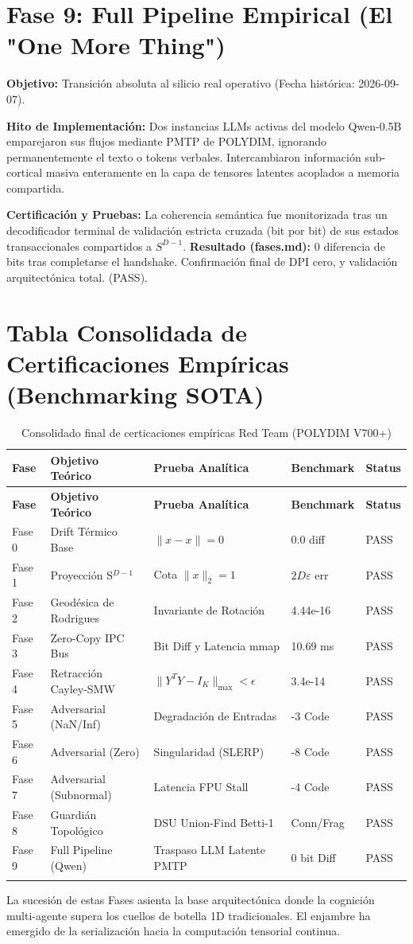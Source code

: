 \section{Fase 9: Full Pipeline Empirical (El "One More Thing")}

\textbf{Objetivo:} Transición absoluta al silicio real operativo (Fecha histórica: 2026-09-07).

\textbf{Hito de Implementación:} Dos instancias LLMs activas del modelo Qwen-0.5B emparejaron sus flujos mediante PMTP de POLYDIM, ignorando permanentemente el texto o tokens verbales. Intercambiaron información sub-cortical masiva enteramente en la capa de tensores latentes acoplados a memoria compartida.

\textbf{Certificación y Pruebas:} La coherencia semántica fue monitorizada tras un decodificador terminal de validación estricta cruzada (bit por bit) de sus estados transaccionales compartidos a $S^{D-1}$.
\textbf{Resultado (fases.md):} 0 diferencia de bits tras completarse el handshake. Confirmación final de DPI cero, y validación arquitectónica total. (PASS).

\section{Tabla Consolidada de Certificaciones Empíricas (Benchmarking SOTA)}

\begin{longtable}{|p{2.5cm}|p{4.5cm}|p{3.5cm}|p{2cm}|p{1.5cm}|}
\hline
\textbf{Fase} & \textbf{Objetivo Teórico} & \textbf{Prueba Analítica} & \textbf{Benchmark} & \textbf{Status} \\ \hline
\endfirsthead
\hline
\textbf{Fase} & \textbf{Objetivo Teórico} & \textbf{Prueba Analítica} & \textbf{Benchmark} & \textbf{Status} \\ \hline
\endhead
Fase 0 & Drift Térmico Base & $\lVert x - x \rVert = 0$ & 0.0 diff & PASS \\ \hline
Fase 1 & Proyección S$^{D-1}$ & Cota $\lVert x \rVert_2 = 1$ & $2D \varepsilon$ err & PASS \\ \hline
Fase 2 & Geodésica de Rodrigues & Invariante de Rotación & 4.44e-16 & PASS \\ \hline
Fase 3 & Zero-Copy IPC Bus & Bit Diff y Latencia mmap & 10.69 ms & PASS \\ \hline
Fase 4 & Retracción Cayley-SMW & $\lVert Y^T Y - I_K \rVert_{\max} < \epsilon$ & 3.4e-14 & PASS \\ \hline
Fase 5 & Adversarial (NaN/Inf) & Degradación de Entradas & -3 Code & PASS \\ \hline
Fase 6 & Adversarial (Zero) & Singularidad (SLERP) & -8 Code & PASS \\ \hline
Fase 7 & Adversarial (Subnormal) & Latencia FPU Stall & -4 Code & PASS \\ \hline
Fase 8 & Guardián Topológico & DSU Union-Find Betti-1 & Conn/Frag & PASS \\ \hline
Fase 9 & Full Pipeline (Qwen) & Traspaso LLM Latente PMTP & 0 bit Diff & PASS \\ \hline
\caption{Consolidado final de certicaciones empíricas Red Team (POLYDIM V700+)}
\end{longtable}

La sucesión de estas Fases asienta la base arquitectónica donde la cognición multi-agente supera los cuellos de botella 1D tradicionales. El enjambre ha emergido de la serialización hacia la computación tensorial continua.
